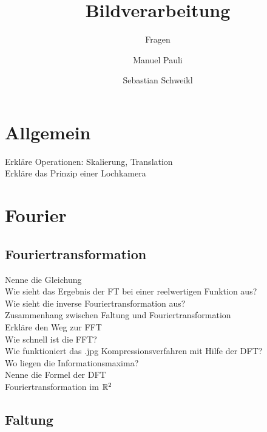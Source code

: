 
\usepackage[pdftex]{graphicx}  


\title{Bildverarbeitung}
\subtitle{Fragen}
\author{Manuel Pauli\and{}Sebastian Schweikl}

\maketitle
\section{Allgemein} 
\begin{description}
	\item[Erkläre Operationen: Skalierung, Translation]
	\item[Erkläre das Prinzip einer Lochkamera]
\end{description}	
\section{Fourier}
\subsection{Fouriertransformation}
\begin{description}
	\item[Nenne die Gleichung]
	\item[Wie sieht das Ergebnis der FT bei einer reelwertigen Funktion aus?]
	\item[Wie sieht die inverse Fouriertransformation aus?]
	\item[Zusammenhang zwischen Faltung und Fouriertransformation]
	\item[Erkläre den Weg zur FFT]
	\item[Wie schnell ist die FFT?]
	\item[Wie funktioniert das .jpg Kompressionsverfahren mit Hilfe der DFT?]
	\item[Wo liegen die Informationsmaxima?]
	\item[Nenne die Formel der DFT]
	\item[Fouriertransformation im $\mathbb{R}^2$]
\end{description}
\subsection{Faltung}
